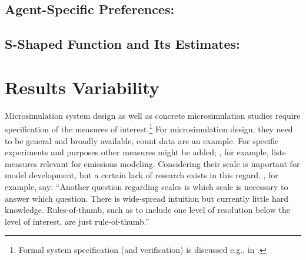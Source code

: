 \subsection{Agent-Specific Preferences:}
\label{sec:agent-specific-prefs}

\subsection{S-Shaped Function and Its Estimates:}
\label{sec:s-shaped-function}


\vfill\eject
\section{Results Variability}
\label{sec:variability}
Microsimulation system design as well as concrete microsimulation studies require specification of the measures  of interest.\footnote{%
Formal system specification (and verification) is discussed e.g., in \citet[][]{FisherWooldridge_IJCIS_1997, BourahlaBenmohamed_ENTCS_2005}. 
} For microsimulation design, they need to be general and broadly available, count data are an example. For specific experiments and purposes other measures might be added; \citet[][]{Kitamura_TMIP_1996}, for example, lists measures relevant for emissions modeling. Considering their scale is important for model development, but a certain lack of research exists in this regard. \citet[][Section 2.2]{NagelAxhausen_TechRep_IVT_2001}, for example, say: ``Another question regarding scales is which scale is necessary to answer which question. There is wide-spread intuition but currently little hard knowledge. Rules-of-thumb, such as to include one level of resolution below the level of interest, are just rule-of-thumb.'' 

